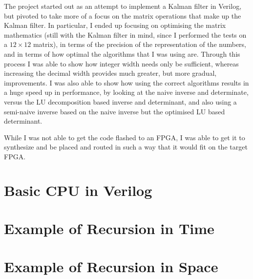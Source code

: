 \documentclass[12pt]{article}
\begin{document}
The project started out as an attempt to implement a Kalman filter in Verilog, but pivoted to take more of a focus on the matrix operations that make up the Kalman filter. In particular, I ended up focusing on optimising the matrix mathematics (still with the Kalman filter in mind, since I performed the tests on a $12 \times 12$ matrix), in terms of the precision of the representation of the numbers, and in terms of how optimal the algorithms that I was using are. Through this process I was able to show how integer width needs only be sufficient, whereas increasing the decimal width provides much greater, but more gradual, improvements. I was also able to show how using the correct algorithms results in a huge speed up in performance, by looking at the naive inverse and determinate, versus the LU decomposition based inverse and determinant, and also using a semi-naive inverse based on the naive inverse but the optimised LU based determinant.

While I was not able to get the code flashed to an FPGA, I was able to get it to synthesize and be placed and routed in such a way that it would fit on the target FPGA.

\printbibliography

\appendix

\renewcommand{\thesection}{Appendix \Alph{section}}

\section{Basic CPU in Verilog}
\label{verilog_cpu}



\section{Example of Recursion in Time}
\label{recursion_time}



\section{Example of Recursion in Space}
\label{recursion_space}


\end{document}
